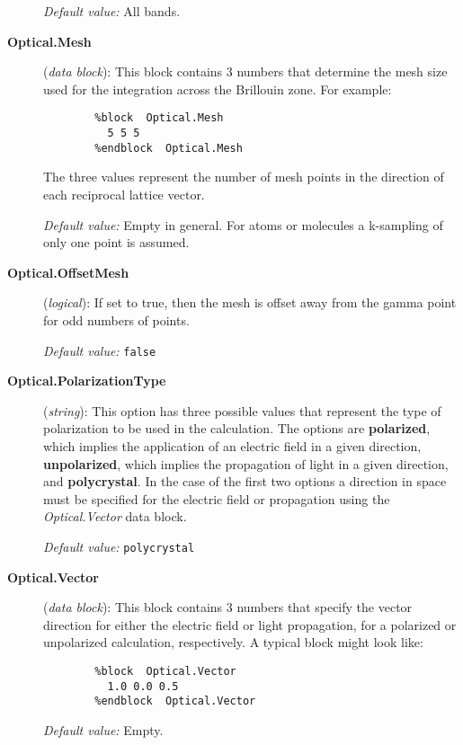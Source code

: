 \documentclass[11pt]{article}
\begin{document}
\begin{description}
{\it Default value:} All bands.

\item[{\bf Optical.Mesh}] ({\it data block}):
This block contains 3 numbers that determine the mesh size
used for the integration across the Brillouin zone. For
example:

\begin{verbatim}
        %block  Optical.Mesh
          5 5 5
        %endblock  Optical.Mesh
\end{verbatim}

The three values represent the number of mesh points in
the direction of each reciprocal lattice vector.

{\it Default value:} Empty in general. For atoms 
or molecules a k-sampling of only one point is assumed.

\item[{\bf Optical.OffsetMesh}] ({\it logical}):
If set to true, then the mesh is offset away from the
gamma point for odd numbers of points.

{\it Default value:} {\tt false}

\item[{\bf Optical.PolarizationType}] ({\it string}):
This option has three possible values that represent the
type of polarization to be used in the calculation. The options
are {\bf polarized}, which implies the application of an electric
field in a given direction, {\bf unpolarized}, which implies the
propagation of light in a given direction, and {\bf polycrystal}.
In the case of the first two options a direction in space must
be specified for the electric field or propagation using the
{\it Optical.Vector} data block.

{\it Default value:} {\tt polycrystal}

\item[{\bf Optical.Vector}] ({\it data block}):
This block contains 3 numbers that specify the vector direction
for either the electric field or light propagation, for a polarized
or unpolarized calculation, respectively. A typical block might look
like:

\begin{verbatim}
        %block  Optical.Vector
          1.0 0.0 0.5
        %endblock  Optical.Vector
\end{verbatim}

{\it Default value:} Empty.

\end{description}
\end{document}
